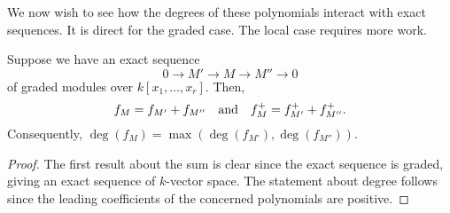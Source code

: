 \documentclass[12pt]{article}
\begin{document}
We now wish to see how the degrees of these polynomials interact with exact sequences. It is direct for the graded case. The local case requires more work.

\begin{prop}
	Suppose we have an exact sequence
	\begin{equation*} 
		0 \to M' \to M \to M'' \to 0
	\end{equation*}
	of graded modules over $k[x_{1}, \ldots, x_{r}]$. Then,
	\begin{equation*} 
		f_{M} = f_{M'} + f_{M''} \quad\text{and}\quad f_{M}^{+} = f_{M'}^{+} + f_{M''}^{+}.
	\end{equation*}
	Consequently, $\deg(f_{M}) = \max(\deg(f_{M'}), \deg(f_{M''}))$.
\end{prop}
\begin{proof} 
	The first result about the sum is clear since the exact sequence is graded, giving an exact sequence of $k$-vector space. \newline
	The statement about degree follows since the leading coefficients of the concerned polynomials are positive.
\end{proof}
\end{document}
